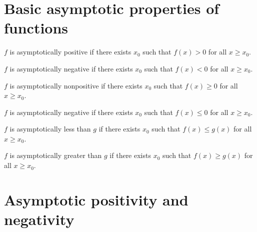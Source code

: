 \section{Basic asymptotic properties of functions}

\begin{definition}
    \label{def:asymp_pos}
    \leanok
    $f$ is asymptotically positive if there exists $x_0$ such that $f(x) > 0$
    for all $x \ge x_0$.

\end{definition}

\begin{definition}
    \label{def:asymp_neg}
    \leanok
    $f$ is asymptotically negative if there exists $x_0$ such that $f(x) < 0$
    for all $x \ge x_0$.

\end{definition}

\begin{definition}
    \label{def:asymp_nonpos}
    \leanok
    $f$ is asymptotically nonpositive if there exists $x_0$ such that $f(x) \ge 0$
    for all $x \ge x_0$.

\end{definition}

\begin{definition}
    \label{def:asymp_nonneg}
    \leanok
    $f$ is asymptotically negative if there exists $x_0$ such that $f(x) \le 0$
    for all $x \ge x_0$.

\end{definition}

\begin{definition} 
    \label{def:asymp_le} 
    \leanok
    $f$ is asymptotically less than $g$ if there exists $x_0$ such that
    $f(x) \le g(x)$ for all $x \ge x_0$.

\end{definition}

\begin{definition}
    \label{def:asymp_ge}
    \leanok
    $f$ is asymptotically greater than $g$ if there exists $x_0$ such that
    $f(x) \ge g(x)$ for all $x \ge x_0$.

\end{definition}

\section{Asymptotic positivity and negativity}

